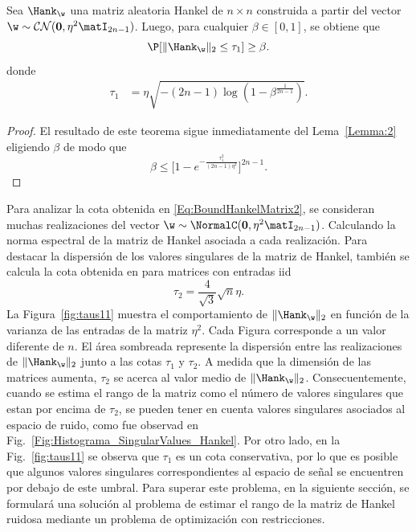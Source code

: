 	\begin{theorem}\label{Th:boundHankelMatrix2}
		Sea $\Hank_{\w}$ una matriz aleatoria Hankel de $n\times n$ construida a partir del vector $\w \sim\mathcal{CN}(\mathbf{0},\eta^2\matI_{2n-1})$. Luego, para cualquier $\beta\in [0,1]$, se obtiene que
		\[ \P[\|\Hank_{\w}\|_2\le \tau_1]\ge\beta.
		\]
		donde 
		\begin{equation}
			\begin{aligned} 
				\tau_1 & =  \eta\sqrt{-(2n-1)\log(1-\beta^{\frac{1}{2n-1}})}. 
			\end{aligned}
			\label{Eq:BoundHankelMatrix2}
		\end{equation}
	\end{theorem}				
	\begin{proof}
		El resultado de este teorema sigue inmediatamente del Lema~\ref{Lemma:2} eligiendo $\beta$ de modo que
		\[\beta \leq \bigg[1-e^{-\frac{\tau_1^2}{(2n-1)\eta^2}}\bigg]^{2n-1}. 
		\]
	\end{proof}
	Para analizar la cota obtenida en \eqref{Eq:BoundHankelMatrix2}, se consideran muchas realizaciones del vector $\w\sim\NormalC(\mathbf{0},\eta^2\matI_{2n-1})$. Calculando la norma espectral de la matriz de Hankel asociada a cada realización. Para destacar la dispersión de los valores singulares de la matriz de Hankel, también se calcula la cota obtenida en \cite{Gavish2014} para matrices con entradas iid
	\begin{equation}
		\tau_2 = \frac{4}{\sqrt{3}}\sqrt{n}\eta.
		\label{eq:gavish}
	\end{equation}
	La Figura~\ref{fig:taus11} muestra el comportamiento de $\|\Hank_\w\|_2$ en función de la varianza de las entradas de la matriz $\eta^2$. Cada Figura corresponde a un valor diferente de $n$. El área sombreada represente la dispersión entre las realizaciones de $\|\Hank_\w\|_2$ junto a las cotas $\tau_1$ y $\tau_2$. A medida que la dimensión de las matrices aumenta, $\tau_2$ se acerca al valor medio de $\|\Hank_\w\|_2$. Consecuentemente, cuando se estima el rango de la matriz como el número de valores singulares que estan por encima de $\tau_2$, se pueden tener en cuenta valores singulares asociados al espacio de ruido,  como fue observad en Fig.~\ref{Fig:Histograma_SingularValues_Hankel}. Por otro lado, en la Fig.~\ref{fig:taus11} se observa que $\tau_1$ es un cota conservativa, por lo que es posible que algunos valores singulares correspondientes al espacio de señal se encuentren por debajo de este umbral. Para superar este problema, en la siguiente sección, se formulará una solución al problema de estimar el rango de la matriz de Hankel ruidosa mediante un problema de optimización con restricciones.
	
